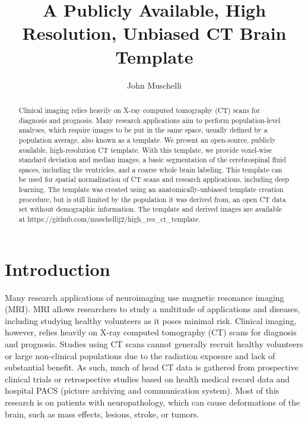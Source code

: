 \documentclass[]{elsarticle} %
\begin{document}
\begin{frontmatter}

  \title{A Publicly Available, High Resolution, Unbiased CT Brain Template}
    \author[JHSPH]{John Muschelli}
      \address[JHSPH]{Johns Hopkins Bloomberg School of Public Health, Department of Biostatistics, 615 N Wolfe St, Baltimore, MD, 21205}
    
  \begin{abstract}
  Clinical imaging relies heavily on X-ray computed tomography (CT) scans for diagnosis and prognosis. Many research applications aim to perform population-level analyses, which require images to be put in the same space, usually defined by a population average, also known as a template. We present an open-source, publicly available, high-resolution CT template. With this template, we provide voxel-wise standard deviation and median images, a basic segmentation of the cerebrospinal fluid spaces, including the ventricles, and a coarse whole brain labeling. This template can be used for spatial normalization of CT scans and research applications, including deep learning. The template was created using an anatomically-unbiased template creation procedure, but is still limited by the population it was derived from, an open CT data set without demographic information. The template and derived images are available at https://github.com/muschellij2/high\_res\_ct\_template.
  \end{abstract}
  
 \end{frontmatter}

\hypertarget{introduction}{%
\section{Introduction}\label{introduction}}

Many research applications of neuroimaging use magnetic resonance imaging (MRI). MRI allows researchers to study a multitude of applications and diseases, including studying healthy volunteers as it poses minimal risk. Clinical imaging, however, relies heavily on X-ray computed tomography (CT) scans for diagnosis and prognosis. Studies using CT scans cannot generally recruit healthy volunteers or large non-clinical populations due to the radiation exposure and lack of substantial benefit. As such, much of head CT data is gathered from prospective clinical trials or retrospective studies based on health medical record data and hospital PACS (picture archiving and communication system). Most of this research is on patients with neuropathology, which can cause deformations of the brain, such as mass effects, lesions, stroke, or tumors.
\end{document}
